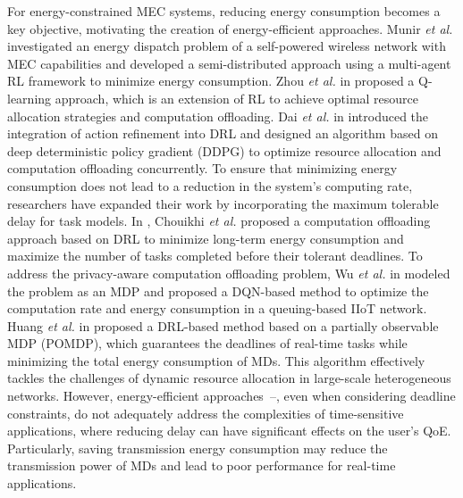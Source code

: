 \documentclass[12pt,draftclsnofoot,onecolumn]{IEEEtran}
\begin{document}
	For energy-constrained MEC systems, reducing energy consumption becomes a key objective, motivating the creation of energy-efficient approaches. 
	Munir \textit{et al.} \cite{munir2021multi}  investigated an energy dispatch problem of a self-powered wireless network with MEC capabilities and developed a semi-distributed approach using a multi-agent RL framework to minimize energy consumption.
	Zhou \textit{et al.} in \cite{zhou2021deep} proposed a Q-learning approach, which is an extension of RL to achieve optimal resource allocation strategies and computation offloading.
	Dai \textit{et al.} in \cite{dai2020edge} introduced the integration of action refinement into DRL and designed an algorithm based on deep deterministic policy gradient (DDPG) to optimize resource allocation and computation offloading concurrently. 
	To ensure that minimizing energy consumption does not lead to a reduction in the system's computing rate, researchers have expanded their work by incorporating the maximum tolerable delay for task models.
	In \cite{chouikhi2023energy}, Chouikhi \textit{et al.} proposed a computation offloading approach based on DRL to minimize long-term energy consumption and maximize the number of tasks completed before their tolerant deadlines.
	To address the privacy-aware computation offloading problem, Wu \textit{et al.} in \cite{wu2024combining} modeled the problem as an MDP and proposed a DQN-based method to optimize the computation rate and energy consumption in a queuing-based IIoT network. 
	Huang \textit{et al.} in \cite{huang2021deadline} proposed a DRL-based method based on a partially observable MDP (POMDP), which guarantees the deadlines of real-time tasks while minimizing the total energy consumption of MDs. This algorithm effectively tackles the challenges of dynamic resource allocation in large-scale heterogeneous networks. 
	However, energy-efficient approaches~\cite{munir2021multi}--\cite{huang2021deadline}, even when considering deadline constraints, do not adequately address the complexities of time-sensitive applications, where reducing delay can have significant effects on the user's QoE. Particularly, saving transmission energy consumption may reduce the transmission power of MDs and lead to poor performance for real-time applications. 
	
\end{document}
